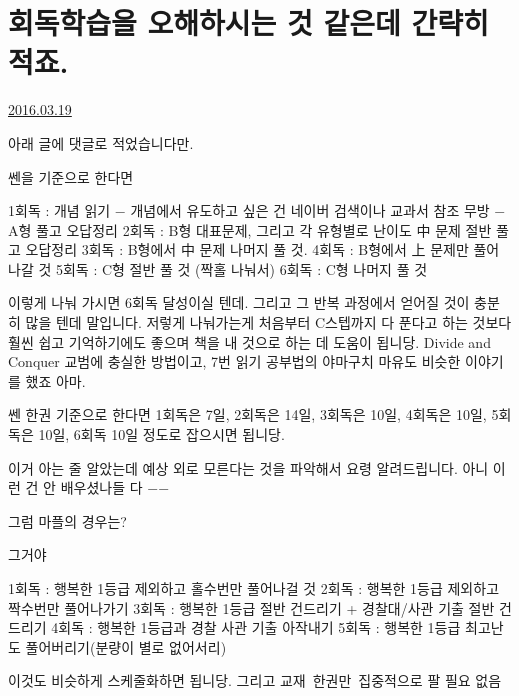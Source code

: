 \section{회독학습을 오해하시는 것 같은데 간략히 적죠.}
\href{https://www.kockoc.com/Apoc/683063}{2016.03.19}

\vspace{5mm}

아래 글에 댓글로 적었습니다만.
\vspace{5mm}

쎈을 기준으로 한다면
\vspace{5mm}

1회독 : 개념 읽기 $-$ 개념에서 유도하고 싶은 건 네이버 검색이나 교과서 참조 무방 $-$ A형 풀고 오답정리
2회독 : B형 대표문제, 그리고 각 유형별로 난이도 中 문제 절반 풀고 오답정리
3회독 : B형에서 中 문제 나머지 풀 것.
4회독 : B형에서 上 문제만 풀어나갈 것
5회독 : C형 절반 풀 것 (짝홀 나눠서)
6회독 : C형 나머지 풀 것
\vspace{5mm}

이렇게 나눠 가시면 6회독 달성이실 텐데. 그리고 그 반복 과정에서 얻어질 것이 충분히 많을 텐데 말입니다.
저렇게 나눠가는게 처음부터 C스텝까지 다 푼다고 하는 것보다 훨씬 쉽고 기억하기에도 좋으며 책을 내 것으로 하는 데 도움이 됩니당.
Divide and Conquer 교범에 충실한 방법이고, 7번 읽기 공부법의 야마구치 마유도 비슷한 이야기를 했죠 아마.
\vspace{5mm}

쎈 한권 기준으로 한다면 1회독은 7일, 2회독은 14일, 3회독은 10일, 4회독은 10일, 5회독은 10일, 6회독 10일 정도로 잡으시면 됩니당.
\vspace{5mm}

이거 아는 줄 알았는데 예상 외로 모른다는 것을 파악해서 요령 알려드립니다. 아니 이런 건 안 배우셨나들 다 $-$$-$
\vspace{5mm}

그럼 마플의 경우는?
\vspace{5mm}

그거야
\vspace{5mm}

1회독 : 행복한 1등급 제외하고 홀수번만 풀어나걸 것
2회독 : 행복한 1등급 제외하고 짝수번만 풀어나가기
3회독 : 행복한 1등급 절반 건드리기 + 경찰대/사관 기출 절반 건드리기
4회독 : 행복한 1등급과 경찰 사관 기출 아작내기
5회독 : 행복한 1등급 최고난도 풀어버리기(분량이 별로 없어서리)
\vspace{5mm}

이것도 비슷하게 스케줄화하면 됩니당.
그리고 교재 한권만 집중적으로 팔 필요 없음
\vspace{5mm}

